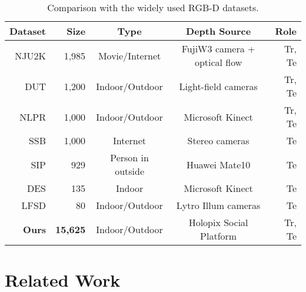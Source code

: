 \documentclass[10pt,twocolumn,letterpaper]{article}
\begin{document}
\begin{table}[t!]
  \centering
\scriptsize
  \renewcommand{\arraystretch}{1.2}
  \renewcommand{\tabcolsep}{1.2mm}
  \caption{\small Comparison with the widely used RGB-D datasets.
  }
\label{tab:existing_rgbd_dataset}
  \begin{tabular}{r|r|c|c|r}
  \hline
    \textbf{Dataset} & \textbf{Size} & \textbf{Type} & \textbf{Depth Source}                     &  \textbf{Role} \\
   \hline
   \hline
    NJU2K\cite{NJU2000}  &1,985  &Movie/Internet  & FujiW3 camera + optical flow  &Tr, Te \\
    DUT \cite{dmra_iccv19} & 1,200  & Indoor/Outdoor & Light-field cameras &Tr, Te \\
    NLPR \cite{peng2014rgbd} &1,000  & Indoor/Outdoor&  Microsoft Kinect &Tr, Te  \\
    SSB \cite{niu2012leveraging}   &1,000  & Internet & Stereo cameras  &Te\\
    SIP \cite{sip_dataset} & 929   & Person in outside & Huawei Mate10 &Te \\
    DES \cite{cheng2014depth}  &135  & Indoor& Microsoft Kinect &Te \\
    LFSD \cite{li2014saliency}   &80  & Indoor/Outdoor& Lytro Illum cameras &Te\\
  \hline
  \textbf{Ours} & \textbf{15,625}   & Indoor/Outdoor & Holopix Social Platform & Tr, Te \\
  \hline

  \end{tabular}
  \vspace{-4mm}
\end{table}


\section{Related Work}
\end{document}
